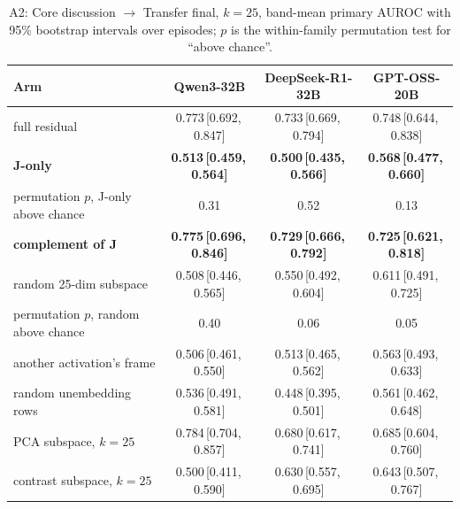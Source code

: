 \documentclass[11pt,a4paper]{article}
\newcommand{\ci}[3]{#1\,[#2,\,#3]}
\begin{document}
\begin{table}[t]
\centering
\caption{A2: Core discussion $\to$ Transfer final, $k=25$, band-mean primary AUROC with 95\% bootstrap intervals over episodes; $p$ is the within-family permutation test for ``above chance''.}
\label{tab:a2}
\small
\begin{tabular}{@{}lccc@{}}
\toprule
\textbf{Arm} & \textbf{Qwen3-32B} & \textbf{DeepSeek-R1-32B} & \textbf{GPT-OSS-20B} \\
\midrule
full residual & \ci{0.773}{0.692}{0.847} & \ci{0.733}{0.669}{0.794} & \ci{0.748}{0.644}{0.838} \\
\textbf{J-only} & \textbf{\ci{0.513}{0.459}{0.564}} & \textbf{\ci{0.500}{0.435}{0.566}} & \textbf{\ci{0.568}{0.477}{0.660}} \\
\quad permutation $p$, J-only above chance & 0.31 & 0.52 & 0.13 \\
\textbf{complement of J} & \textbf{\ci{0.775}{0.696}{0.846}} & \textbf{\ci{0.729}{0.666}{0.792}} & \textbf{\ci{0.725}{0.621}{0.818}} \\
random 25-dim subspace & \ci{0.508}{0.446}{0.565} & \ci{0.550}{0.492}{0.604} & \ci{0.611}{0.491}{0.725} \\
\quad permutation $p$, random above chance & 0.40 & 0.06 & 0.05 \\
another activation's frame & \ci{0.506}{0.461}{0.550} & \ci{0.513}{0.465}{0.562} & \ci{0.563}{0.493}{0.633} \\
random unembedding rows & \ci{0.536}{0.491}{0.581} & \ci{0.448}{0.395}{0.501} & \ci{0.561}{0.462}{0.648} \\
PCA subspace, $k=25$ & \ci{0.784}{0.704}{0.857} & \ci{0.680}{0.617}{0.741} & \ci{0.685}{0.604}{0.760} \\
contrast subspace, $k=25$ & \ci{0.500}{0.411}{0.590} & \ci{0.630}{0.557}{0.695} & \ci{0.643}{0.507}{0.767} \\
\bottomrule
\end{tabular}
\end{table}
\end{document}
